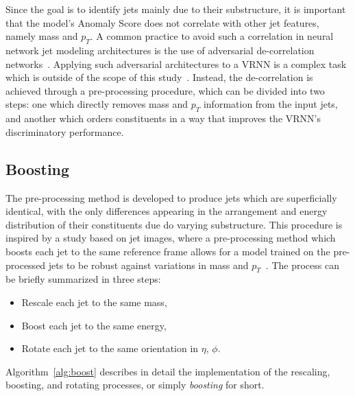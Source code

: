 \documentclass[11pt, a4paper]{article}
\begin{document}
Since the goal is to identify jets mainly due to their substructure, it is important that the model's Anomaly Score does not correlate with other jet features, namely mass and $p_{T}$. A common practice to avoid such a correlation in neural network jet modeling architectures is the use of adversarial de-correlation networks~\cite{louppe2017learning}. Applying such adversarial architectures to a VRNN is a complex task which is outside of the scope of this study~\cite{Purushotham2017VariationalRA}. Instead, the de-correlation is achieved through a pre-processing procedure, which can be divided into two steps: one which directly removes mass and $p_{T}$ information from the input jets, and another which orders constituents in a way that improves the VRNN's discriminatory performance.

\subsection{Boosting}

The pre-processing method is developed to produce jets which are superficially identical, with the only differences appearing in the arrangement and energy distribution of their constituents due do varying substructure. This procedure is inspired by a study based on jet images, where a pre-processing method which boosts each jet to the same reference frame allows for a model trained on the pre-processed jets to be robust against variations in mass and $p_{T}$~\cite{roy2020robust}. The process can be briefly summarized in three steps:

\begin{itemize}
	\item{Rescale each jet to the same mass,}
	\item{Boost each jet to the same energy,}
	\item{Rotate each jet to the same orientation in $\eta$, $\phi$.}
\end{itemize}

Algorithm~\ref{alg:boost} describes in detail the implementation of the rescaling, boosting, and rotating processes, or simply \textit{boosting} for short. 
\end{document}
